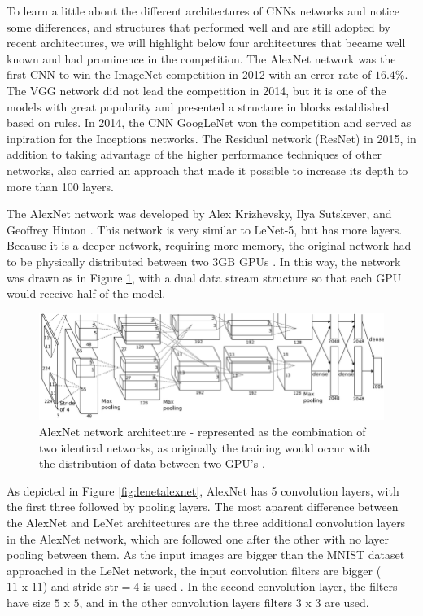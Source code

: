 To learn a little about the different architectures of CNNs networks and notice some differences, and structures that performed well and are still adopted by recent architectures, we will highlight below four architectures that became well known and had prominence in the competition. The AlexNet network was the first CNN to win the ImageNet competition in 2012 with an error rate of $16.4\%$. The VGG network did not lead the competition in 2014, but it is one of the models with great popularity and presented a structure in blocks established based on rules. In 2014, the CNN GoogLeNet won the competition and served as inpiration for the Inceptions networks. The Residual network (ResNet) in 2015, in addition to taking advantage of the higher performance techniques of other networks, also carried an approach that made it possible to increase its depth to more than 100 layers.

The AlexNet network was developed by Alex Krizhevsky, Ilya Sutskever, and Geoffrey Hinton \cite{geron2019}. This network is very similar to LeNet-5, but has more layers. Because it is a deeper network, requiring more memory, the original network had to be physically distributed between two 3GB GPUs  \cite{krizhevsky2012}. In this way, the network was drawn as in Figure \ref{fig:alexnet}, with a dual data stream structure so that each GPU would receive half of the model.

\begin{figure}
    \centering
    \includegraphics[scale=0.4]{"Part 3 - Learning Systems/Supervised Learning/Deep Learning/images/figure128.png"}
    \caption{ AlexNet network architecture - represented as the combination of two identical networks, as originally the training would occur with the distribution of data between two GPU's \cite{krizhevsky2012}.}
    \label{fig:alexnet}
\end{figure}

As depicted in Figure \ref{fig:lenetalexnet}, AlexNet has 5 convolution layers, with the first three followed by pooling layers. The most aparent difference between the AlexNet and LeNet architectures are the three additional convolution layers in the AlexNet network, which are followed one after the other with no layer pooling between them. As the input images are bigger than the MNIST dataset approached in the LeNet network, the input convolution filters are bigger ($11\text{ x }11$) and stride $\text{str} = 4$ is used . In the second convolution layer, the filters have size $5\text{ x }5$, and in the other convolution layers filters $3\text{ x }3$ are used.

